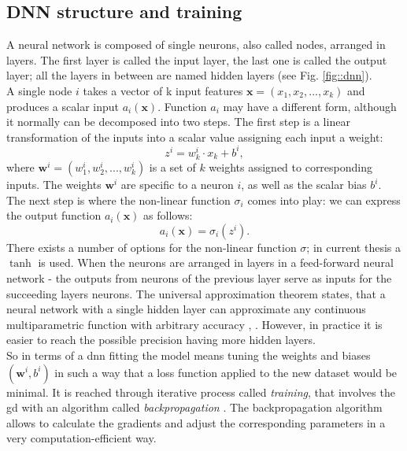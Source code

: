 \subsection{DNN structure and training}
A neural network is composed of single neurons, also called nodes, arranged in layers. The first layer is called the input layer, the last one is called the output layer; all the layers in between are named hidden layers (see Fig. \ref{fig::dnn}). \\
A single node $i$ takes a vector of k input features $\textbf{x}=(x_1,x_2,...,x_k)$ and produces a scalar input $a_i(\textbf{x})$. Function $a_i$ may have a different form, although it normally can be decomposed into two steps. The first step is a linear transformation of the inputs into a scalar value assigning each input a weight:
\begin{equation}
z^{i}=w^{i}_k\cdot x_k+b^{i},
\end{equation}
where $\textbf{w}^i=(w^i_1,w^i_2,...,w^i_k)$ is a set of $k$ weights assigned to corresponding inputs. The weights $\textbf{w}^i$ are specific to a neuron $i$, as well as the scalar bias $b^i$. The next step is where the non-linear function $\sigma_i$ comes into play: we can express the output function $a_i(\textbf{x})$ as follows:
\begin{equation}
a_i(\textbf{x})=\sigma_i(z^{i}).
\end{equation}
There exists a number of options for the non-linear function $\sigma$; in current thesis a $\tanh$ is used. When the neurons are arranged in layers in a feed-forward neural network - the outputs from neurons of the previous layer serve as inputs for the succeeding layers neurons. The universal approximation theorem states, that a neural network with a single hidden layer can approximate any continuous multiparametric function with arbitrary accuracy \cite{Kurt1991251}, \cite{Cybenko1989}. However, in practice it is easier to reach the possible precision having more hidden layers. \\
So in terms of a \gls{dnn} fitting the model means tuning the weights and biases $(\textbf{w}^i,b^i)$ in such a way that a loss function applied to the new dataset would be minimal. It is reached through iterative process called \textit{training}, that involves the \gls{gd} with an algorithm called \textit{backpropagation} \cite{RumelhartZipser:86}. The backpropagation algorithm allows to calculate the gradients and adjust the corresponding parameters in a very computation-efficient way. \\
